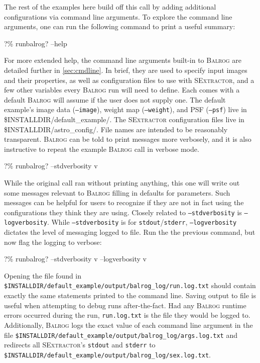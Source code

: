 \documentclass[11pt]{book}
\newcommand{\codett}[1]{\texttt{#1}}
\newcommand{\balrog}{\textsc{Balrog}}
\newcommand{\sex}{\textsc{SExtractor}}
\newcommand{\opt}[1]{\codett{--#1}}
\newcommand{\bcmd}{\% runbalrog}
\begin{document}
\noindent The rest of the examples here build off this call by adding additional configurations via command line arguments.
To explore the command line arguments, one can run the following command to print a useful summary:

\begin{cmdline}
?\bcmd{}? --help
\end{cmdline}

\noindent For more extended help, the command line arguments built-in to \balrog{} are detailed further in \autoref{sec:cmdline}.
In brief, they are used to specify input images and their properties, as well as configuration
files to use with \sex{}, and a few other variables every \balrog{} run will need to define. 
Each comes with a default \balrog{} will assume if the user does not supply one.
The default example's image data (\opt{image}), 
weight map (\opt{weight}), 
and PSF (\opt{psf})
live in {\ttfamily \$INSTALLDIR/default\_example/}.
The \sex{} configuration files live in 
{\ttfamily \$INSTALLDIR/astro\_config/}. 
File names are intended to be reasonably transparent.
\balrog{} can be told to print messages more verbosely, 
and it is also instructive to repeat the example \balrog{} call in verbose mode.

\begin{cmdline}
?\bcmd{}? --stdverbosity v
\end{cmdline}

\noindent While the original call ran without printing anything, this one will write out some messages
relevant to \balrog{} filling in defaults for parameters.
Such messages can be helpful for users to recognize 
if they are not in fact using the configurations they think they are using.
Closely related to \opt{stdverbosity} is \opt{logverbosity}.
While \opt{stdverbosity} is for \codett{stdout}/\codett{stderr},
\opt{logverbosity} dictates the level of messaging logged to file.
Run the the previous command, but now flag the logging to verbose:

\begin{cmdline}
?\bcmd? --stdverbosity v --logverbosity v
\end{cmdline}

\noindent Opening the file found in \codett{\$INSTALLDIR/default\_example/output/balrog\_log/run.log.txt}
should contain exactly the same statements printed to the command line.
Saving output to file is useful when attempting to debug runs after-the-fact.
Had any \balrog{} runtime errors occurred during the run,
\codett{run.log.txt} is the file they would be logged to.
Additionally, \balrog{} logs the exact value of each command line argument in the file
\codett{\$INSTALLDIR/default\_example/output/balrog\_log/args.log.txt}
and redirects all \sex{}'s \codett{stdout} and \codett{stderr} to \codett{\$INSTALLDIR/default\_example/output/balrog\_log/sex.log.txt}.
\end{document}
